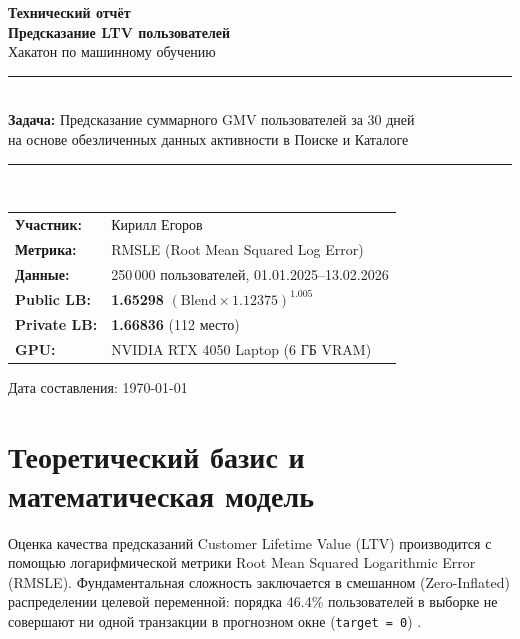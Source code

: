 \documentclass[12pt, a4paper]{article}
\newcommand{\rmsleGood}[1]{\textbf{\color{success}#1}}
\newcommand{\rmsleNeutral}[1]{\textbf{\color{primary}#1}}
\begin{document}
	
	\begin{titlepage}
		\centering\vspace*{2cm}
		{\Huge\bfseries\color{primary} Технический отчёт}\\[0.5cm]
		{\Large\bfseries Предсказание LTV пользователей}\\[0.3cm]
		{\large Хакатон по машинному обучению}\\[2cm]
		\rule{\textwidth}{1.5pt}\\[0.4cm]
		{\large\bfseries Задача:} Предсказание суммарного GMV пользователей за 30 дней\\
		на основе обезличенных данных активности в Поиске и Каталоге\\[0.4cm]
		\rule{\textwidth}{0.8pt}\\[2cm]
		\begin{tabular}{ll}
			\textbf{Участник:}    & Кирилл Егоров \\[0.3cm]
			\textbf{Метрика:}     & RMSLE (Root Mean Squared Log Error) \\[0.3cm]
			\textbf{Данные:}      & 250\,000 пользователей, 01.01.2025--13.02.2026 \\[0.3cm]
			\textbf{Public LB:}   & \rmsleGood{1.65298} $(\text{Blend} \times 1.12375)^{1.005}$ \\[0.3cm]
			\textbf{Private LB:}  & \rmsleNeutral{1.66836} (112 место) \\[0.3cm]
			\textbf{GPU:}         & NVIDIA RTX 4050 Laptop (6 ГБ VRAM) \\
		\end{tabular}
		\vfill
		{\small Дата составления: \today}
	\end{titlepage}
	
	\tableofcontents\newpage
	
	\section{Теоретический базис и математическая модель}
	
	Оценка качества предсказаний Customer Lifetime Value (LTV) производится с помощью логарифмической метрики Root Mean Squared Logarithmic Error (RMSLE). 
	Фундаментальная сложность заключается в смешанном (Zero-Inflated) распределении целевой переменной: порядка 46.4\% пользователей в выборке не совершают ни одной транзакции в прогнозном окне (\texttt{target = 0}) \cite{ref:train}. 
	
\end{document}
